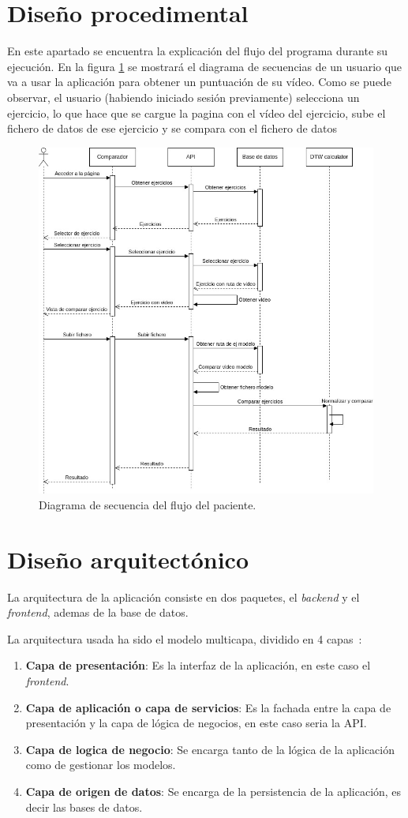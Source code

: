 \section{Diseño procedimental}
En este apartado se encuentra la explicación del flujo del programa durante su ejecución. En la figura \ref{fig:diagramasec} se mostrará el diagrama de secuencias de un usuario que va a usar la aplicación para obtener un puntuación de su vídeo. 
Como se puede observar, el usuario (habiendo iniciado sesión previamente) selecciona un ejercicio, lo que hace que se cargue la pagina con el vídeo del ejercicio, sube el fichero de datos de ese ejercicio y se compara con el fichero de datos 
\begin{figure}
	\centering
	\includegraphics[width=0.7\linewidth]{img/diagramaSec}
	\caption{Diagrama de secuencia del flujo del paciente.}
	\label{fig:diagramasec}
\end{figure}

 
\section{Diseño arquitectónico}
La arquitectura de la aplicación consiste en dos paquetes, el \textit{backend} y el \textit{frontend}, ademas de la base de datos. 

La arquitectura usada ha sido el modelo multicapa, dividido en 4 capas~\cite{capas}:
\begin{enumerate}
	\item \textbf{Capa de presentación}: Es la interfaz de la aplicación, en este caso el \textit{frontend}.
	\item \textbf{Capa de aplicación o capa de servicios}: Es la fachada entre la capa de presentación y la capa de lógica de negocios, en este caso seria la API.
	\item \textbf{Capa de logica de negocio}: Se encarga tanto de la lógica de la aplicación como de gestionar los modelos.
	\item \textbf{Capa de origen de datos}: Se encarga de la persistencia de la aplicación, es decir las bases de datos.
\end{enumerate}


